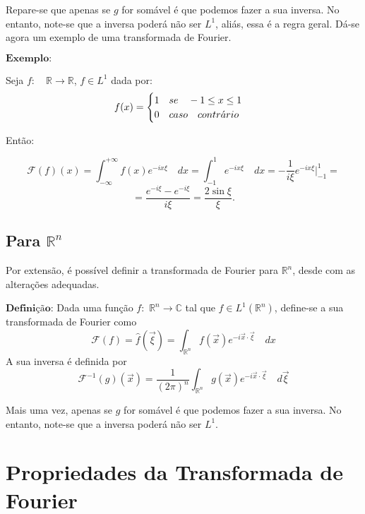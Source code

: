 \documentclass{article}
\begin{document}
Repare-se que apenas se \(g\) for somável é que podemos fazer a sua inversa. No entanto, note-se que a inversa poderá não ser \(L^{1}\), aliás, essa é a regra geral. Dá-se agora um exemplo de uma transformada de Fourier.

\(\textbf{Exemplo:}\)

Seja \(f:\quad\mathbb{R}\to\mathbb{R}\), \(f\in L^{1}\) dada por:
\[f(x)= \begin{cases} 1\quad se\quad-1\leq x\leq 1 \\0\quad caso\quad contr\Acute{a}rio \end{cases}\]

Então:

\[\mathcal{F}(f)(x)=\displaystyle\int_{-\infty}^{+\infty}f(x)e^{-ix\xi}\quad dx=\displaystyle\int_{-1}^{1}e^{-ix\xi}\quad dx=-\frac{1}{i\xi}e^{-ix\xi}\Biggr|_{-1}^{1}=\]\[=\frac{e^{-i\xi}-e^{-i\xi}}{i\xi}=\frac{2\sin{\xi}}{\xi}.\]

\subsection{Para \(\mathbb{R}^n\)}
Por extensão, é possível definir a transformada de Fourier para \(\mathbb{R}^n\), desde com as alterações adequadas.

\(\textbf{Definição:}\) Dada uma função \(f:\) \(\mathbb{R}^n\rightarrow\mathbb{C}\) tal que \(f\in L^1(\mathbb{R}^n)\), define-se a sua transformada de Fourier como
\[\mathcal{F}(f)=\hat{f}(\Vec{\xi}) = \displaystyle\int_{\mathbb{R}^n}f(\vec{x})e^{-i\vec{x}\cdot\vec{\xi}}\quad dx\]
A sua inversa é definida por
\[\mathcal{F}^{-1}(g)(\vec{x})=\frac{1}{(2\pi)^{n}} \displaystyle\int_{\mathbb{R}^n}g(\vec{x})e^{-i\vec{x}\cdot\vec{\xi}}\quad d\Vec{\xi}\]

Mais uma vez, apenas se \(g\) for somável é que podemos fazer a sua inversa. No entanto, note-se que a inversa poderá não ser \(L^{1}\).

\section{Propriedades da Transformada de Fourier}
\end{document}
